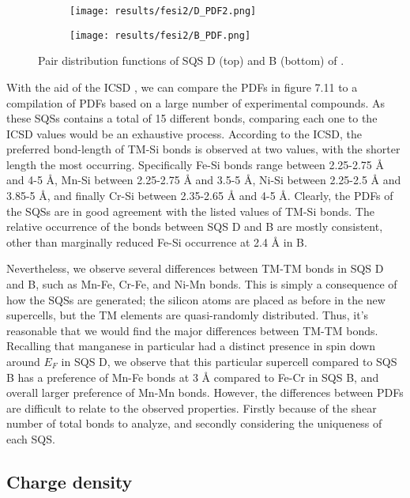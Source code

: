 \begin{figure}[H]
	\centering
	\begin{subfigure}{\textwidth}
		\texttt{[image: results/fesi2/D\_PDF2.png]}
	\end{subfigure}
	\begin{subfigure}{\textwidth}
		\texttt{[image: results/fesi2/B\_PDF.png]}
	\end{subfigure}
	\caption{Pair distribution functions of SQS D (top) and B (bottom) of .}
\end{figure}

With the aid of the ICSD \cite{icsd}, we can compare the PDFs in figure 7.11 to a compilation of PDFs based on a large number of experimental compounds. As these SQSs contains a total of 15 different bonds, comparing each one to the ICSD values would be an exhaustive process. According to the ICSD, the preferred bond-length of TM-Si bonds is observed at two values, with the shorter length the most occurring. Specifically Fe-Si bonds range between 2.25-2.75 Å and 4-5 Å, Mn-Si between 2.25-2.75 Å and 3.5-5 Å, Ni-Si between 2.25-2.5 Å and 3.85-5 Å, and finally Cr-Si between 2.35-2.65 Å and 4-5 Å. Clearly, the PDFs of the SQSs are in good agreement with the listed values of TM-Si bonds. The relative occurrence of the bonds between SQS D and B are mostly consistent, other than marginally reduced Fe-Si occurrence at 2.4 Å in B.

Nevertheless, we observe several differences between TM-TM bonds in SQS D and B, such as  Mn-Fe, Cr-Fe, and Ni-Mn bonds. This is simply a consequence of how the SQSs are generated; the silicon atoms are placed as before in the new supercells, but the TM elements are quasi-randomly distributed. Thus, it's reasonable that we would find the major differences between TM-TM bonds. Recalling that manganese in particular had a distinct presence in spin down around $E_F$ in SQS D, we observe that this particular supercell compared to SQS B has a preference of Mn-Fe bonds at 3 Å compared to Fe-Cr in SQS B, and overall larger preference of Mn-Mn bonds. However, the differences between PDFs are difficult to relate to the observed properties. Firstly because of the shear number of total bonds to analyze, and secondly considering the uniqueness of each SQS.

\subsection{Charge density}

